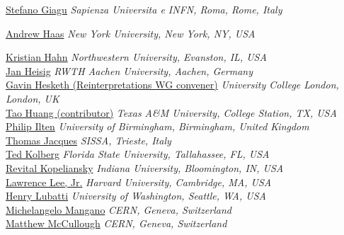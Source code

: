 \noindent\href{mailto:stefano.giagu@cern.ch}{Stefano Giagu}
\emph{Sapienza Universita e INFN, Roma, Rome, Italy}

\noindent\href{mailto:drandyhaas@gmail.com}{Andrew Haas}
\emph{New York University, New York, NY, USA}

\noindent\href{mailto:kristian.hahn@northwestern.edu}{Kristian Hahn} 
\emph{Northwestern University, Evanston, IL, USA}\\

\noindent\href{mailto:heisig@physik.rwth-aachen.de}{Jan Heisig} 
\emph{RWTH Aachen University, Aachen, Germany}\\

\noindent\href{mailto:gavin.hesketh@ucl.ac.uk}{Gavin Hesketh (Reinterpretations WG convener)}
\emph{University College London, London, UK}\\

\noindent\href{mailto:tao.huang@cern.ch}{Tao Huang (contributor)}
\emph{Texas A\&M University, College Station, TX, USA}\\

\noindent\href{mailto:philip.james.ilten@cern.ch}{Philip Ilten}
\emph{University of Birmingham, Birmingham, United Kingdom}\\

\noindent\href{mailto:thomas.jacques@sissa.it}{Thomas Jacques}
\emph{SISSA, Trieste, Italy}\\

\noindent\href{mailto:ted.ritchie.kolberg@cern.ch}{Ted Kolberg}
\emph{Florida State University, Tallahassee, FL, USA}\\

\noindent\href{mailto:revital.kopeliansky@cern.ch}{Revital Kopeliansky}
\emph{Indiana University, Bloomington, IN, USA}\\

\noindent\href{mailto:lawrence.lee.jr@cern.ch}{Lawrence Lee, Jr.}
\emph{Harvard University, Cambridge, MA, USA}\\

\noindent\href{mailto:lubatti@u.washington.edu}{Henry Lubatti}
\emph{University of Washington, Seattle, WA, USA}\\

\noindent\href{mailto:Michelangelo.Mangano@cern.ch}{Michelangelo Mangano}
\emph{CERN, Geneva, Switzerland}\\

\noindent\href{mailto:matthew.mccullough@cern.ch}{Matthew McCullough}
\emph{CERN, Geneva, Switzerland}\\

